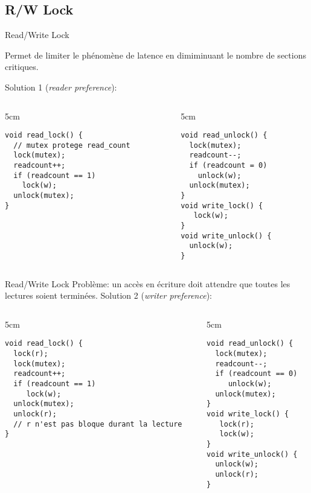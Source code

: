 \subsection{R/W Lock}

\begin{frame}[fragile]{Read/Write Lock}

Permet de limiter le phénomène  de latence en dimiminuant le nombre de
sections critiques.

Solution 1 (\emph{reader preference}):
\begin{columns}
  \begin{column} {5cm}
    \begin{lstlisting}
void read_lock() {
  // mutex protege read_count
  lock(mutex);
  readcount++;
  if (readcount == 1)
    lock(w);
  unlock(mutex);
}
    \end{lstlisting}
  \end{column}
  \begin{column} {5cm}
    \begin{lstlisting}
void read_unlock() {
  lock(mutex);
  readcount--;
  if (readcount = 0)
    unlock(w);
  unlock(mutex);
}
void write_lock() {
   lock(w);
}
void write_unlock() {
  unlock(w);
}
    \end{lstlisting}
  \end{column}
\end{columns}
\end{frame}

\begin{frame}[fragile]{Read/Write Lock}
  Problème: un accès en écriture doit attendre que toutes les lectures
  soient terminées. Solution 2 (\emph{writer preference}):
  \begin{columns}
    \begin{column} {5cm}
      \begin{lstlisting}
void read_lock() {
  lock(r);
  lock(mutex);
  readcount++;
  if (readcount == 1)
     lock(w);
  unlock(mutex);
  unlock(r);
  // r n'est pas bloque durant la lecture
}
       \end{lstlisting}
     \end{column}
     \begin{column} {5cm}
       \begin{lstlisting}
void read_unlock() {
  lock(mutex);
  readcount--;
  if (readcount == 0)
     unlock(w);
  unlock(mutex);
}
void write_lock() {
   lock(r);
   lock(w);
}
void write_unlock() {
  unlock(w);
  unlock(r);
}
      \end{lstlisting}
    \end{column}
  \end{columns}
\end{frame}

